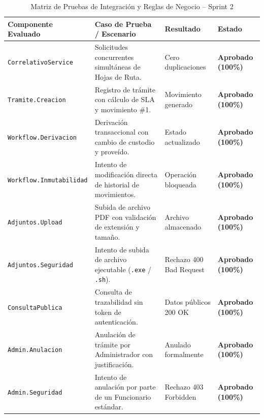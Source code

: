 \documentclass[a4paper,12pt]{article}
\begin{document}
\begin{table}[H]
\centering
\footnotesize
\caption{Matriz de Pruebas de Integración y Reglas de Negocio -- Sprint 2}
\label{tab:test_sprint2}
\begin{tabularx}{\linewidth}{@{}>{\raggedright\arraybackslash}p{3.2cm}Y>{\raggedright\arraybackslash}p{2.8cm}>{\centering\arraybackslash}p{2.2cm}@{}}
\toprule
\textbf{Componente Evaluado} & \textbf{Caso de Prueba / Escenario} & \textbf{Resultado} & \textbf{Estado} \\
\midrule
\nolinkurl{CorrelativoService} & Solicitudes concurrentes simultáneas de Hojas de Ruta. & Cero duplicaciones & \textbf{\color{colorExito}Aprobado (100\%)} \\
\nolinkurl{Tramite.Creacion} & Registro de trámite con cálculo de SLA y movimiento \#1. & Movimiento generado & \textbf{\color{colorExito}Aprobado (100\%)} \\
\nolinkurl{Workflow.Derivacion} & Derivación transaccional con cambio de custodio y proveído. & Estado actualizado & \textbf{\color{colorExito}Aprobado (100\%)} \\
\nolinkurl{Workflow.Inmutabilidad} & Intento de modificación directa de historial de movimientos. & Operación bloqueada & \textbf{\color{colorExito}Aprobado (100\%)} \\
\nolinkurl{Adjuntos.Upload} & Subida de archivo PDF con validación de extensión y tamaño. & Archivo almacenado & \textbf{\color{colorExito}Aprobado (100\%)} \\
\nolinkurl{Adjuntos.Seguridad} & Intento de subida de archivo ejecutable (\texttt{.exe} / \texttt{.sh}). & Rechazo 400 Bad Request & \textbf{\color{colorExito}Aprobado (100\%)} \\
\nolinkurl{ConsultaPublica} & Consulta de trazabilidad sin token de autenticación. & Datos públicos 200 OK & \textbf{\color{colorExito}Aprobado (100\%)} \\
\nolinkurl{Admin.Anulacion} & Anulación de trámite por Administrador con justificación. & Anulado formalmente & \textbf{\color{colorExito}Aprobado (100\%)} \\
\nolinkurl{Admin.Seguridad} & Intento de anulación por parte de un Funcionario estándar. & Rechazo 403 Forbidden & \textbf{\color{colorExito}Aprobado (100\%)} \\
\bottomrule
\end{tabularx}
\end{table}

\end{document}
